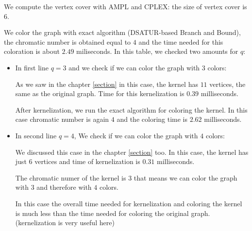 \documentclass{beamer}
\begin{document}
{\begin{defi}
We compute the vertex cover with AMPL and CPLEX: the size of vertex cover is $6$. 

We color the graph with exact algorithm (DSATUR-based Branch and Bound), the chromatic number is obtained equal to $4$ and the time needed for this coloration is about $2.49$ miliseconds.  In this table, we checked two amounts for $q$: 

\begin{itemize}
\item In first line $q = 3$ and we check if we can color the graph with $3$ colors:

As we saw in the chapter \ref{section} in this case, the kernel has $11$ vertices, the same as the original graph. Time for this kernelization is $0.39$ milliseconds. 

After kernelization, we run the exact algorithm for coloring the kernel. In this case chromatic number is again $4$ and the coloring time is $2.62$ milliseconds. 

\item In second line $q = 4$, We check if we can color the graph with $4$ colors:

We discussed this case in the chapter \ref{section} too. In this case, the kernel has just $6$ vertices and time of kernelization is $0.31$ milliseconds.

The chromatic numer of the kernel is $3$ that means we can color the graph with $3$ and therefore with $4$ colors. 

In this case the overall time needed for kernelization and coloring the kernel is much less than the time needed for coloring the original graph. (kernelization is very useful here)
\end{itemize}


\end{defi}}
\end{document}
